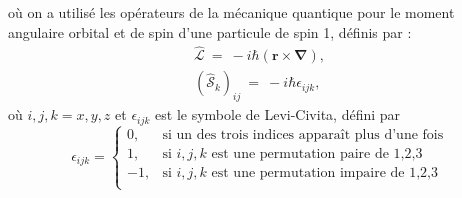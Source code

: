 où on a utilisé les opérateurs de la mécanique quantique pour le moment angulaire orbital et de spin d'une particule de spin 1, définis par :
\begin{equation}
\begin{aligned}
\hat{\mathcal{L}}~=~-i\hbar(\bm{r}\times\bm{\nabla}),\\
(\hat{\mathcal{S}}_k)_{ij}~=~-i\hbar\epsilon_{ijk},
\end{aligned} 
\label{defLS_hat}
\end{equation}
où $i,j,k=x,y,z$ et $\epsilon_{ijk}$ est le symbole de Levi-Civita, défini par 
\begin{equation}
\epsilon_{ijk}=\left\lbrace
\begin{array}{rl}
0,& \mbox{si un des trois indices apparaît plus d'une fois}\\
1,&\mbox{si }i,j,k\mbox{ est une permutation paire de 1,2,3}\\
-1,&\mbox{si }i,j,k\mbox{ est une permutation impaire de 1,2,3}\\
\end{array}
\right.
\end{equation}

